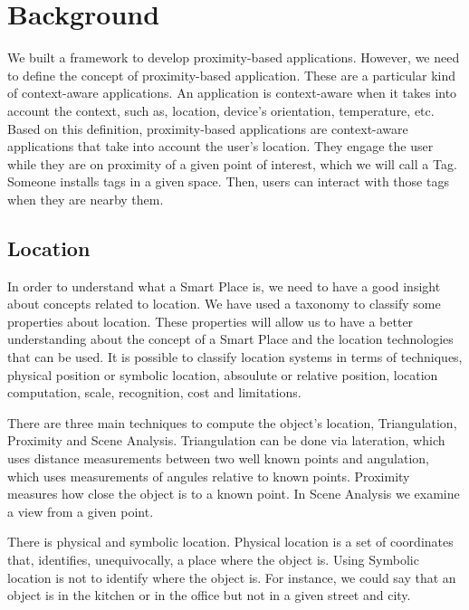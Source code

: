 
\section{Background}
\label{sec:background}
We built a framework to develop proximity-based applications.
However, we need to define the concept of proximity-based application.
These are a particular kind of context-aware applications.
An application is context-aware when it takes into account the context, such as, location, device's orientation, temperature, etc.
Based on this definition, proximity-based applications are context-aware applications that take into account the user's location.
They engage the user while they are on proximity of a given point of interest, which we will call a Tag.
Someone installs tags in a given space.
Then, users can interact with those tags when they are nearby them.

\subsection{Location}
\label{sec:background_location}
In order to understand what a Smart Place is, we need to have a good insight about concepts related to location.
We have used a taxonomy\cite{location} to classify some properties about location.
These properties will allow us to have a better understanding about the concept of a Smart Place and the location technologies that can be used.
It is possible to classify location systems in terms of techniques, physical position or symbolic location, absoulute or relative position, location computation, scale, recognition, cost and limitations.

There are three main techniques to compute the object's location, Triangulation, Proximity and Scene Analysis.
Triangulation can be done via lateration, which uses distance measurements between two well known points and angulation, which uses measurements of angules relative to known points.
Proximity measures how close the object is to a known point.
In Scene Analysis we examine a view from a given point.

There is physical and symbolic location.
Physical location is a set of coordinates that, identifies, unequivocally, a place where the object is.
Using Symbolic location is not to identify where the object is. For instance, we could say that an object is in the kitchen or in the office but not in a given street and city.

